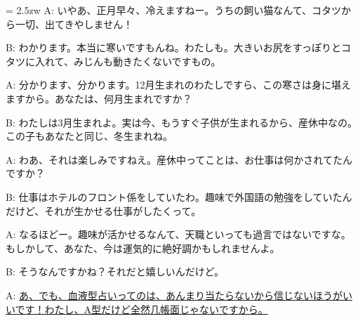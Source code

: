 \documentclass[11pt]{amsart}
\title{}
\author{}
\newenvironment{hangall}[1]{\hangindent = 2.5zw\everypar{\hangindent = 2.5zw}}{}
\begin{document}
\maketitle
\begin{hangall}{}%
A: いやあ、正月早々、冷えますねー。うちの飼い猫なんて、コタツから一切、出てきやしません！

B: わかります。本当に寒いですもんね。わたしも。大きいお尻をすっぽりとコタツに入れて、みじんも動きたくないですもの。

A: 分かります、分かります。12月生まれのわたしですら、この寒さは身に堪えますから。あなたは、何月生まれですか？

B: わたしは3月生まれよ。実は今、もうすぐ子供が生まれるから、産休中なの。この子もあなたと同じ、冬生まれね。

A: わあ、それは楽しみですねえ。産休中ってことは、お仕事は何かされてたんですか？

B: 仕事はホテルのフロント係をしていたわ。趣味で外国語の勉強をしていたんだけど、それが生かせる仕事がしたくって。

A: なるほどー。趣味が活かせるなんて、天職といっても過言ではないですな。もしかして、あなた、今は運気的に絶好調かもしれませんよ。

B: そうなんですかね？それだと嬉しいんだけど。

A: \ul{あ、でも、血液型占いってのは、あんまり当たらないから信じないほうがいいです！わたし、A型だけど全然几帳面じゃないですから。}\end{hangall}
\end{document}

